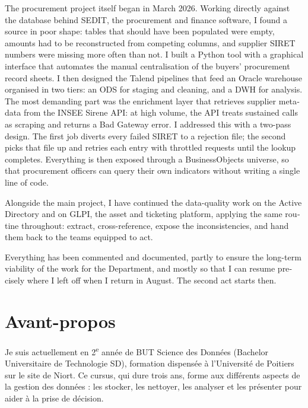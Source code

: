 \documentclass[11pt,a4paper]{article}
\begin{document}
\begin{english}
The procurement project itself began in March 2026. Working directly against the database behind SEDIT, the procurement and finance software, I found a source in poor shape: tables that should have been populated were empty, amounts had to be reconstructed from competing columns, and supplier SIRET numbers were missing more often than not. I built a Python tool with a graphical interface that automates the manual centralisation of the buyers' procurement record sheets. I then designed the Talend pipelines that feed an Oracle warehouse organised in two tiers: an ODS for staging and cleaning, and a DWH for analysis. The most demanding part was the enrichment layer that retrieves supplier metadata from the INSEE Sirene API: at high volume, the API treats sustained calls as scraping and returns a Bad Gateway error. I addressed this with a two-pass design. The first job diverts every failed SIRET to a rejection file; the second picks that file up and retries each entry with throttled requests until the lookup completes. Everything is then exposed through a BusinessObjects universe, so that procurement officers can query their own indicators without writing a single line of code.

Alongside the main project, I have continued the data-quality work on the Active Directory and on GLPI, the asset and ticketing platform, applying the same routine throughout: extract, cross-reference, expose the inconsistencies, and hand them back to the teams equipped to act.

Everything has been commented and documented, partly to ensure the long-term viability of the work for the Department, and mostly so that I can resume precisely where I left off when I return in August. The second act starts then.
\end{english}

\newpage
\section*{Avant-propos}
Je suis actuellement en 2\textsuperscript{e} année de BUT Science des Données (Bachelor Universitaire de Technologie SD), formation dispensée à l'Université de Poitiers sur le site de Niort. Ce cursus, qui dure trois ans, forme aux différents aspects de la gestion des données : les stocker, les nettoyer, les analyser et les présenter pour aider à la prise de décision.
\end{document}
